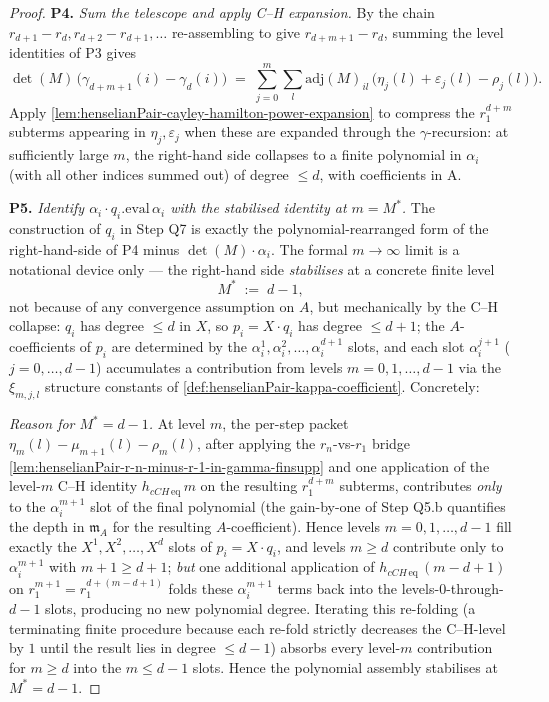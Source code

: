 \begin{proof}
\textbf{P4.} \emph{Sum the telescope and apply C--H expansion.}
By the chain $r_{d+1} - r_d, r_{d+2} - r_{d+1}, \ldots$
re-assembling to give $r_{d+m+1} - r_d$, summing the level
identities of P3 gives
\[
\det(M)\,\bigl(\gamma_{d+m+1}(i) - \gamma_d(i)\bigr)
\;=\;
\sum_{j=0}^{m}\sum_l \mathrm{adj}(M)_{il}\,\bigl(\eta_j(l)
+ \varepsilon_j(l) - \rho_j(l)\bigr).
\]
Apply \cref{lem:henselianPair-cayley-hamilton-power-expansion}
to compress the $r_1^{d+m}$ subterms appearing in $\eta_j,
\varepsilon_j$ when these are expanded through the
$\gamma$-recursion: at sufficiently large $m$, the right-hand side
collapses to a finite polynomial in $\alpha_i$ (with all other
indices summed out) of degree $\le d$, with coefficients in
A.

\textbf{P5.} \emph{Identify $\alpha_i \cdot q_i.\mathrm{eval}\,\alpha_i$
with the stabilised identity at $m = M^*$.} The construction of
$q_i$ in Step Q7 is exactly the polynomial-rearranged form of
the right-hand-side of P4 minus $\det(M) \cdot \alpha_i$. The
formal $m \to \infty$ limit is a notational device only — the
right-hand side \emph{stabilises} at a concrete finite level
\[
M^* \;:=\; d - 1,
\]
not because of any convergence assumption on $A$, but
mechanically by the C--H collapse: $q_i$ has degree $\le d$ in
$X$, so $p_i = X \cdot q_i$ has degree $\le d + 1$; the
$A$-coefficients of $p_i$ are determined by the
$\alpha_i^1, \alpha_i^2, \ldots, \alpha_i^{d+1}$ slots, and each
slot $\alpha_i^{j+1}$ ($j = 0, \ldots, d - 1$) accumulates a
contribution from levels $m = 0, 1, \ldots, d - 1$ via the
$\xi_{m,j,l}$ structure constants of
\cref{def:henselianPair-kappa-coefficient}. Concretely:

\emph{Reason for $M^* = d - 1$.} At level $m$, the per-step
packet $\eta_m(l) - \mu_{m+1}(l) - \rho_m(l)$, after applying
the $r_n$-vs-$r_1$ bridge
\cref{lem:henselianPair-r-n-minus-r-1-in-gamma-finsupp} and one
application of the level-$m$ C--H identity
$h_{cCH\,\mathrm{eq}}\,m$ on the resulting $r_1^{d+m}$
subterms, contributes \emph{only} to the $\alpha_i^{m+1}$ slot
of the final polynomial (the gain-by-one of Step Q5.b
quantifies the depth in $\mathfrak m_A$ for the resulting
$A$-coefficient). Hence levels $m = 0, 1, \ldots, d - 1$ fill
exactly the $X^1, X^2, \ldots, X^d$ slots of
$p_i = X \cdot q_i$, and levels $m \ge d$ contribute only to
$\alpha_i^{m+1}$ with $m + 1 \ge d + 1$; \emph{but} one
additional application of $h_{cCH\,\mathrm{eq}}\,(m - d + 1)$
on $r_1^{m + 1} = r_1^{d + (m - d + 1)}$ folds these
$\alpha_i^{m+1}$ terms back into the levels-$0$-through-$d-1$
slots, producing no new polynomial degree. Iterating this
re-folding (a terminating finite procedure because each
re-fold strictly decreases the C--H-level by $1$ until the
result lies in degree $\le d - 1$) absorbs every level-$m$
contribution for $m \ge d$ into the $m \le d - 1$ slots. Hence
the polynomial assembly stabilises at $M^* = d - 1$.


\end{proof}

